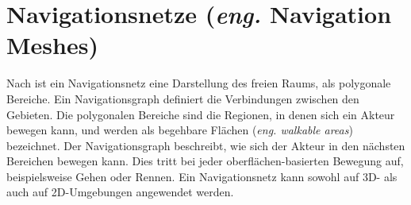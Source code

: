 \section{Navigationsnetze (\textit{eng.} Navigation Meshes)}
%
Nach \cite{Mesh:16} ist ein Navigationsnetz eine Darstellung des freien Raums, als polygonale Bereiche. Ein Navigationsgraph definiert die Verbindungen zwischen den Gebieten. Die polygonalen Bereiche sind die Regionen, in denen sich ein Akteur bewegen kann, und werden als begehbare Flächen (\textit{eng. walkable areas}) bezeichnet. Der Navigationsgraph beschreibt, wie sich der Akteur in den nächsten Bereichen bewegen kann. Dies tritt bei jeder oberflächen-basierten Bewegung auf, beispielsweise Gehen oder Rennen. Ein Navigationsnetz kann sowohl auf 3D- als auch auf 2D-Umgebungen angewendet werden.


